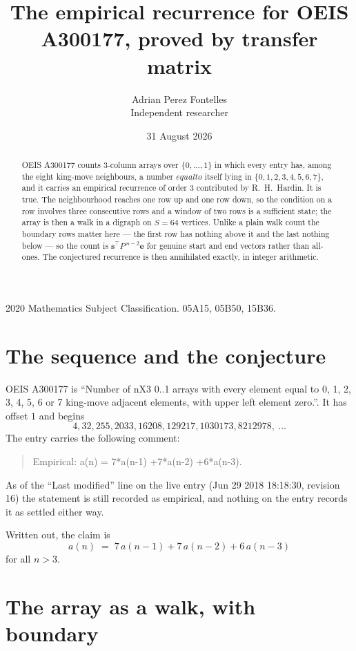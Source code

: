 \documentclass[11pt,a4paper]{article}
\title{The empirical recurrence for OEIS A300177, proved by transfer matrix}
\author{Adrian Perez Fontelles\\ \small Independent researcher}
\date{31 August 2026}
\theoremstyle{plain}
\theoremstyle{definition}
\begin{document}
\maketitle

\begin{abstract}
OEIS A300177 counts $3$-column arrays over $\{0,\dots,1\}$ in which every entry has,
among the eight king-move neighbours, a number $equal to$ itself lying in $\{0,1,2,3,4,5,6,7\}$, and it carries an empirical
recurrence of order $3$ contributed by R.~H.~Hardin. It is true. The neighbourhood
reaches one row up and one row down, so the condition on a row involves three consecutive
rows and a window of two rows is a sufficient state; the array is then a walk in a digraph
on $S=64$ vertices. Unlike a plain walk count the boundary rows matter here --- the first
row has nothing above it and the last nothing below --- so the count is
$\mathbf{s}^{\!\top}P^{\,n-2}\mathbf{e}$ for genuine start and end vectors rather than
all-ones. The conjectured recurrence is then annihilated exactly, in integer arithmetic.
\end{abstract}

\noindent\small 2020 Mathematics Subject Classification. 05A15, 05B50, 15B36.\normalsize

\section{The sequence and the conjecture}

OEIS A300177 is ``Number of nX3 0..1 arrays with every element equal to 0, 1, 2, 3, 4, 5, 6 or 7 king-move adjacent elements, with upper left element zero.''. It has offset
$1$ and begins
\[
4, 32, 255, 2033, 16208, 129217, 1030173, 8212978,\ \dots
\]
The entry carries the following comment:
\begin{quote}\small
Empirical: a(n) = 7*a(n-1) +7*a(n-2) +6*a(n-3).
\end{quote}
As of the ``Last modified'' line on the live entry (Jun 29 2018 18:18:30, revision
16) the statement is still recorded as empirical, and nothing on the entry
records it as settled either way.

Written out, the claim is
\begin{equation}\label{eq:conj}
a(n)\;=\;7\,a(n-1) + 7\,a(n-2) + 6\,a(n-3)
\end{equation}
for all $n>3$.

\section{The array as a walk, with boundary}
\end{document}
